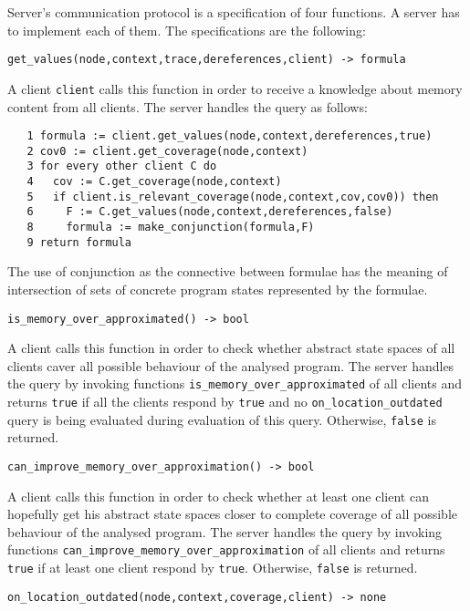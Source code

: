\documentclass[envcountsame]{llncs}
\begin{document}
Server's communication protocol is a specification of four functions. A server
has to  implement each of them. The specifications are the following: \newline

\noindent\texttt{get\_values(node,context,trace,dereferences,client) -> formula}

A client \texttt{client} calls this function in order to receive a knowledge
about memory content from all clients. The server handles the query as follows:
\begin{verbatim}
   1 formula := client.get_values(node,context,dereferences,true)
   2 cov0 := client.get_coverage(node,context)
   3 for every other client C do
   4   cov := C.get_coverage(node,context)
   5   if client.is_relevant_coverage(node,context,cov,cov0)) then
   6     F := C.get_values(node,context,dereferences,false)
   8     formula := make_conjunction(formula,F)
   9 return formula
\end{verbatim}
The use of conjunction as the connective between formulae has the meaning of
intersection of sets of concrete program states represented by the formulae.
\newline

\noindent\texttt{is\_memory\_over\_approximated() -> bool}

A client calls this function in order to check whether abstract state spaces of
all clients caver all possible behaviour of the analysed program. The server
handles the query by invoking functions \texttt{is\_memory\_over\_approximated}
of all clients and returns \texttt{true} if all the clients respond by
\texttt{true} and no \texttt{on\_location\_outdated} query is being evaluated
during evaluation of this query. Otherwise, \texttt{false} is returned. \newline

\noindent\texttt{can\_improve\_memory\_over\_approximation() -> bool}

A client calls this function in order to check whether at least one client can
hopefully get his abstract state spaces closer to complete coverage of all possible
behaviour of the analysed program. The server handles the query by invoking
functions \texttt{can\_improve\_memory\_over\_approximation} of all clients and
returns \texttt{true} if at least one client respond by \texttt{true}.
Otherwise, \texttt{false} is returned. \newline

\noindent\texttt{on\_location\_outdated(node,context,coverage,client) -> none}
\end{document}
